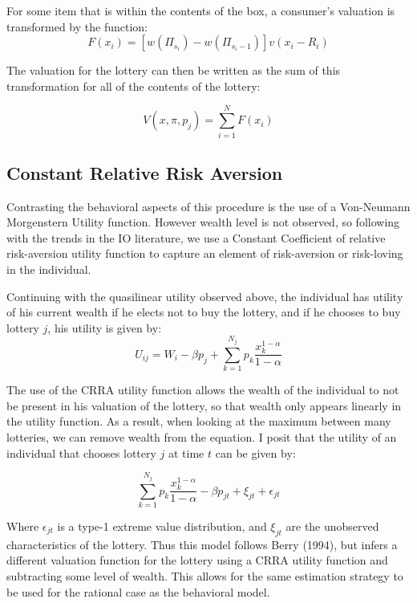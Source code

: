 \documentclass[12pt]{paper}
\newcommand{\brak}[1]{ \left [ #1 \right ] }
\begin{document}
For some item that is within the contents of the box, a consumer's
valuation is transformed by the function:
\begin{equation*}
F(x_i) = \brak{w( \Pi_{s_i}) - w(\Pi_{s_i - 1}) } v( x_i - R_i)
\end{equation*}

The valuation for the lottery can then be written as the sum of this
transformation for all of the contents of the lottery:

\begin{equation*}
  V(x,\pi,p_j) = \sum_{i=1}^N F( x_i)
\end{equation*}

\subsection{Constant  Relative Risk Aversion}

Contrasting the behavioral aspects of this procedure is the use of a
Von-Neumann Morgenstern Utility function. However wealth level is not
observed, so following with the trends in the IO literature, we use a
Constant Coefficient of relative risk-aversion utility function to
capture an element of risk-aversion or risk-loving in the
individual.

Continuing with the quasilinear utility observed above, the individual
has utility of his current wealth if he elects not to buy the lottery,
and if he chooses to buy lottery $j$, his utility is given by:
\begin{equation*}
  U_{ij} = W_i - \beta p_j + \sum_{k=1}^{N_j} p_k \frac{x_k^{1-\alpha}}{1-\alpha}
\end{equation*}

The use of the CRRA utility function allows the wealth of the
individual to not be present in his valuation of the lottery, so that
wealth only appears linearly in the utility function. As a result,
when looking at the maximum between many lotteries, we can remove
wealth from the equation. I posit that the utility of an individual
that chooses lottery $j$ at time $t$ can be given by:

\begin{equation*}
  \sum_{k=1}^{N_j} p_k \frac{x_k^{1-\alpha}}{1-\alpha} - \beta p_{jt} + \xi_{jt} + \epsilon_{jt} 
\end{equation*}

Where $\epsilon_{jt}$ is a type-1 extreme value distribution, and $\xi_{jt}$
are the unobserved characteristics of the lottery. Thus this model
follows Berry (1994), but infers a different valuation function for the
lottery using a CRRA utility function and subtracting some level of
wealth. This allows for the same estimation strategy to be used for
the rational case as the behavioral model. 
\end{document}
